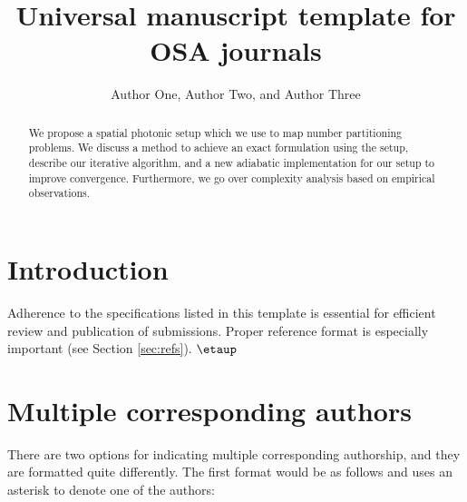 \documentclass{osa-article}
\begin{document}
\title{Universal manuscript template for OSA journals}

\author{Author One, Author Two, and Author Three}

\address{Peer Review, Publications Department, The Optical Society (OSA), 2010 Massachusetts Avenue NW, Washington, DC 20036, USA\\
Publications Department, The Optical Society (OSA), 2010 Massachusetts Avenue NW, Washington, DC 20036, USA\\
Currently with the Department of Electronic Journals, The Optical Society (OSA), 2010 Massachusetts Avenue NW, Washington, DC 20036, USA}




\begin{abstract}
We propose a spatial photonic setup which we use to map number partitioning problems. We discuss a method to achieve an exact formulation using the setup, describe our iterative algorithm, and a new adiabatic implementation for our setup to improve convergence. Furthermore, we go over complexity analysis based on empirical observations.
\end{abstract}

\section{Introduction}
Adherence to the specifications listed in this template is essential for efficient review and publication of submissions. Proper reference format is especially important (see Section \ref{sec:refs}). $\etaup$

\section{Multiple corresponding authors}

There are two options for indicating multiple corresponding authorship, and they are formatted quite differently. The first format would be as follows and uses an asterisk to denote one of the authors:
\end{document}

